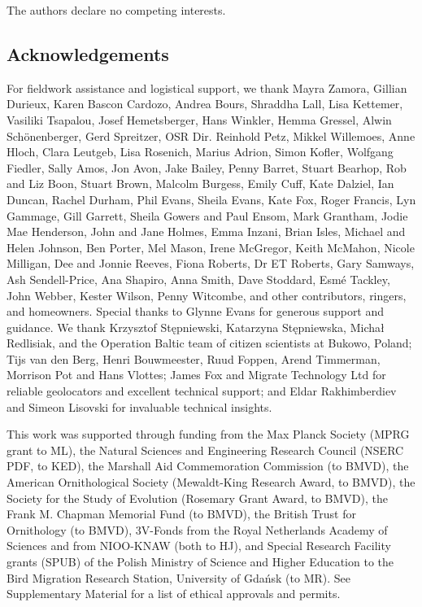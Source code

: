 \documentclass[a4paper, nobind]{templates/ociamthesis}
\begin{document}
The authors declare no competing interests.

\hypertarget{acknowledgements}{%
\subsection{Acknowledgements}\label{acknowledgements}}

For fieldwork assistance and logistical support, we thank Mayra Zamora, Gillian Durieux, Karen Bascon Cardozo, Andrea Bours, Shraddha Lall, Lisa Kettemer, Vasiliki Tsapalou, Josef Hemetsberger, Hans Winkler, Hemma Gressel, Alwin Schönenberger, Gerd Spreitzer, OSR Dir. Reinhold Petz, Mikkel Willemoes, Anne Hloch, Clara Leutgeb, Lisa Rosenich, Marius Adrion, Simon Kofler, Wolfgang Fiedler, Sally Amos, Jon Avon, Jake Bailey, Penny Barret, Stuart Bearhop, Rob and Liz Boon, Stuart Brown, Malcolm Burgess, Emily Cuff, Kate Dalziel, Ian Duncan, Rachel Durham, Phil Evans, Sheila Evans, Kate Fox, Roger Francis, Lyn Gammage, Gill Garrett, Sheila Gowers and Paul Ensom, Mark Grantham, Jodie Mae Henderson, John and Jane Holmes, Emma Inzani, Brian Isles, Michael and Helen Johnson, Ben Porter, Mel Mason, Irene McGregor, Keith McMahon, Nicole Milligan, Dee and Jonnie Reeves, Fiona Roberts, Dr ET Roberts, Gary Samways, Ash Sendell-Price, Ana Shapiro, Anna Smith, Dave Stoddard, Esmé Tackley, John Webber, Kester Wilson, Penny Witcombe, and other contributors, ringers, and homeowners. Special thanks to Glynne Evans for generous support and guidance. We thank Krzysztof Stępniewski, Katarzyna Stępniewska, Michał Redlisiak, and the Operation Baltic team of citizen scientists at Bukowo, Poland; Tijs van den Berg, Henri Bouwmeester, Ruud Foppen, Arend Timmerman, Morrison Pot and Hans Vlottes; James Fox and Migrate Technology Ltd for reliable geolocators and excellent technical support; and Eldar Rakhimberdiev and Simeon Lisovski for invaluable technical insights.

This work was supported through funding from the Max Planck Society (MPRG grant to ML), the Natural Sciences and Engineering Research Council (NSERC PDF, to KED), the Marshall Aid Commemoration Commission (to BMVD), the American Ornithological Society (Mewaldt-King Research Award, to BMVD), the Society for the Study of Evolution (Rosemary Grant Award, to BMVD), the Frank M. Chapman Memorial Fund (to BMVD), the British Trust for Ornithology (to BMVD), 3V-Fonds from the Royal Netherlands Academy of Sciences and from NIOO-KNAW (both to HJ), and Special Research Facility grants (SPUB) of the Polish Ministry of Science and Higher Education to the Bird Migration Research Station, University of Gdańsk (to MR). See Supplementary Material for a list of ethical approvals and permits.
\end{document}
